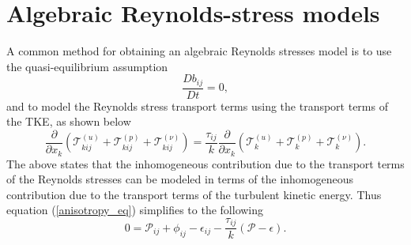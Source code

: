 \documentclass[oneside,a4paper,11pt]{report}
\newcommand{\rs}{\tau}          %
\newcommand{\redi}{\phi}        %
\begin{document}
\section{Algebraic Reynolds-stress models}

A common method for obtaining an algebraic Reynolds stresses model is to use the quasi-equilibrium assumption
\begin{equation}
\frac{D b_{ij}}{Dt} = 0,
\end{equation}
and to model the Reynolds stress transport terms using the transport terms of the TKE, as shown below
\begin{equation}
\frac{\partial}{\partial x_k} \left ( \mathcal{T}^{(u)}_{kij} + \mathcal{T}^{(p)}_{kij} + \mathcal{T}^{(\nu)}_{kij} \right ) = \frac{\rs_{ij}}{k} \frac{\partial}{\partial x_k} \left ( \mathcal{T}^{(u)}_{k} + \mathcal{T}^{(p)}_{k} + \mathcal{T}^{(\nu)}_{k} \right ).
\end{equation} 
The above states that the inhomogeneous contribution due to the transport terms of the Reynolds stresses can be modeled in terms of the inhomogeneous contribution due to the transport terms of the turbulent kinetic energy. Thus equation (\ref{anisotropy_eq}) simplifies to the following
\begin{equation}
\label{algebraic_rs}
0 = \mathcal{P}_{ij} + \redi_{ij} - \epsilon_{ij} - \frac{\rs_{ij}}{k} \left ( \mathcal{P} - \epsilon \right ).
\end{equation}
\end{document}
